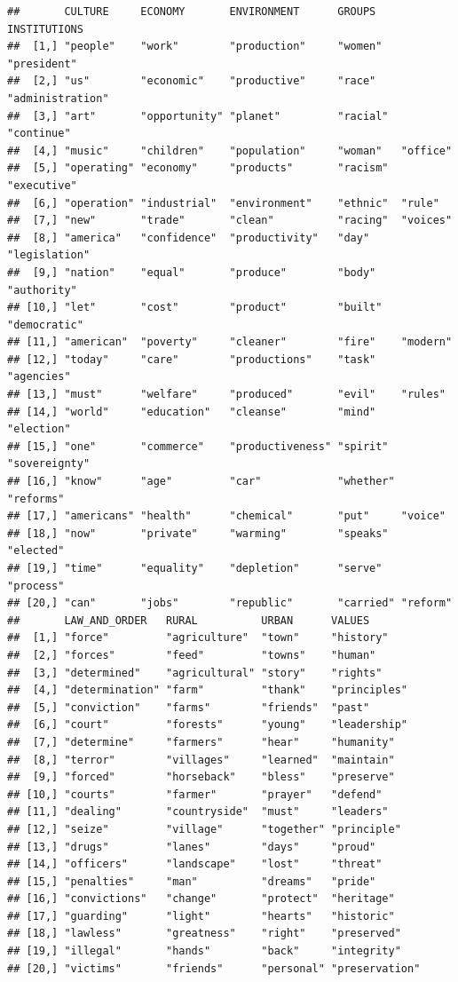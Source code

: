 \documentclass[
]{book}
\begin{document}
\begin{verbatim}
##       CULTURE     ECONOMY       ENVIRONMENT      GROUPS    INSTITUTIONS    
##  [1,] "people"    "work"        "production"     "women"   "president"     
##  [2,] "us"        "economic"    "productive"     "race"    "administration"
##  [3,] "art"       "opportunity" "planet"         "racial"  "continue"      
##  [4,] "music"     "children"    "population"     "woman"   "office"        
##  [5,] "operating" "economy"     "products"       "racism"  "executive"     
##  [6,] "operation" "industrial"  "environment"    "ethnic"  "rule"          
##  [7,] "new"       "trade"       "clean"          "racing"  "voices"        
##  [8,] "america"   "confidence"  "productivity"   "day"     "legislation"   
##  [9,] "nation"    "equal"       "produce"        "body"    "authority"     
## [10,] "let"       "cost"        "product"        "built"   "democratic"    
## [11,] "american"  "poverty"     "cleaner"        "fire"    "modern"        
## [12,] "today"     "care"        "productions"    "task"    "agencies"      
## [13,] "must"      "welfare"     "produced"       "evil"    "rules"         
## [14,] "world"     "education"   "cleanse"        "mind"    "election"      
## [15,] "one"       "commerce"    "productiveness" "spirit"  "sovereignty"   
## [16,] "know"      "age"         "car"            "whether" "reforms"       
## [17,] "americans" "health"      "chemical"       "put"     "voice"         
## [18,] "now"       "private"     "warming"        "speaks"  "elected"       
## [19,] "time"      "equality"    "depletion"      "serve"   "process"       
## [20,] "can"       "jobs"        "republic"       "carried" "reform"        
##       LAW_AND_ORDER   RURAL          URBAN      VALUES        
##  [1,] "force"         "agriculture"  "town"     "history"     
##  [2,] "forces"        "feed"         "towns"    "human"       
##  [3,] "determined"    "agricultural" "story"    "rights"      
##  [4,] "determination" "farm"         "thank"    "principles"  
##  [5,] "conviction"    "farms"        "friends"  "past"        
##  [6,] "court"         "forests"      "young"    "leadership"  
##  [7,] "determine"     "farmers"      "hear"     "humanity"    
##  [8,] "terror"        "villages"     "learned"  "maintain"    
##  [9,] "forced"        "horseback"    "bless"    "preserve"    
## [10,] "courts"        "farmer"       "prayer"   "defend"      
## [11,] "dealing"       "countryside"  "must"     "leaders"     
## [12,] "seize"         "village"      "together" "principle"   
## [13,] "drugs"         "lanes"        "days"     "proud"       
## [14,] "officers"      "landscape"    "lost"     "threat"      
## [15,] "penalties"     "man"          "dreams"   "pride"       
## [16,] "convictions"   "change"       "protect"  "heritage"    
## [17,] "guarding"      "light"        "hearts"   "historic"    
## [18,] "lawless"       "greatness"    "right"    "preserved"   
## [19,] "illegal"       "hands"        "back"     "integrity"   
## [20,] "victims"       "friends"      "personal" "preservation"
\end{verbatim}
\end{document}
